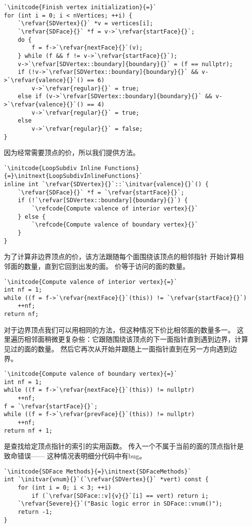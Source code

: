 \begin{lstlisting}
`\initcode{Finish vertex initialization}{=}`
for (int i = 0; i < nVertices; ++i) {
    `\refvar{SDVertex}{}` *v = vertices[i];
    `\refvar{SDFace}{}` *f = v->`\refvar{startFace}{}`;
    do {
        f = f->`\refvar{nextFace}{}`(v);
    } while (f && f != v->`\refvar{startFace}{}`);
    v->`\refvar[SDVertex::boundary]{boundary}{}` = (f == nullptr);
    if (!v->`\refvar[SDVertex::boundary]{boundary}{}` && v->`\refvar{valence}{}`() == 6)
        v->`\refvar{regular}{}` = true;
    else if (v->`\refvar[SDVertex::boundary]{boundary}{}` && v->`\refvar{valence}{}`() == 4)
        v->`\refvar{regular}{}` = true;
    else
        v->`\refvar{regular}{}` = false;
}
\end{lstlisting}

因为经常需要顶点的价，所以我们提供方法。
\begin{lstlisting}
`\initcode{LoopSubdiv Inline Functions}{=}\initnext{LoopSubdivInlineFunctions}`
inline int `\refvar{SDVertex}{}`::`\initvar{valence}{}`() {
    `\refvar{SDFace}{}` *f = `\refvar{startFace}{}`;
    if (!`\refvar[SDVertex::boundary]{boundary}{}`) {
        `\refcode{Compute valence of interior vertex}{}`
    } else {
        `\refcode{Compute valence of boundary vertex}{}`
    }
}
\end{lstlisting}

为了计算非边界顶点的价，该方法跟随每个面围绕该顶点的相邻指针
开始计算相邻面的数量，直到它回到出发的面。
价等于访问的面的数量。
\begin{lstlisting}
`\initcode{Compute valence of interior vertex}{=}`
int nf = 1;
while ((f = f->`\refvar{nextFace}{}`(this)) != `\refvar{startFace}{}`)
    ++nf;
return nf;
\end{lstlisting}

对于边界顶点我们可以用相同的方法，但这种情况下价比相邻面的数量多一。
这里遍历相邻面稍微更复杂些：它跟随围绕该顶点的下一面指针直到遇到边界，计算见过的面的数量。
然后它再次从开始并跟随上一面指针直到在另一方向遇到边界。
\begin{lstlisting}
`\initcode{Compute valence of boundary vertex}{=}`
int nf = 1;
while ((f = f->`\refvar{nextFace}{}`(this)) != nullptr)
    ++nf;
f = `\refvar{startFace}{}`;
while ((f = f->`\refvar{prevFace}{}`(this)) != nullptr)
    ++nf;
return nf + 1;
\end{lstlisting}

是查找给定顶点指针的索引的实用函数。
传入一个不属于当前的面的顶点指针是致命错误——
这种情况表明细分代码中有bug。
\begin{lstlisting}
`\initcode{SDFace Methods}{=}\initnext{SDFaceMethods}`
int `\initvar{vnum}{}`(`\refvar{SDVertex}{}` *vert) const {
    for (int i = 0; i < 3; ++i)
        if (`\refvar[SDFace::v]{v}{}`[i] == vert) return i;
    `\refvar{Severe}{}`("Basic logic error in SDFace::vnum()");
    return -1;
}
\end{lstlisting}

